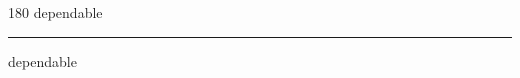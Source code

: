 
\begin{frame}
\begin{center}
\begin{turn}{180}
{\fontsize{2.5cm}{1em}\selectfont dependable}
\end{turn}
\vspace{1em}\par  
\hrule
\vspace{1em}\par  
{\fontsize{2.5cm}{1em}\selectfont dependable}
\end{center}
\end{frame}
